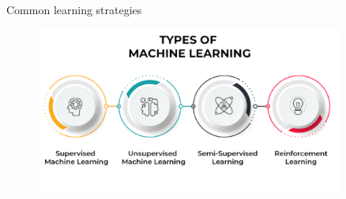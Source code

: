 \documentclass[10pt,aspectratio=169,dvipsnames]{beamer} %
\begin{document}
	\setcounter{subfigure}{0}
	\begin{frame}{Common learning strategies}
		\centering
		\begin{figure}
			\includegraphics[width=0.9\textwidth]{learning.png}
		\end{figure}
	\end{frame}
\end{document}
